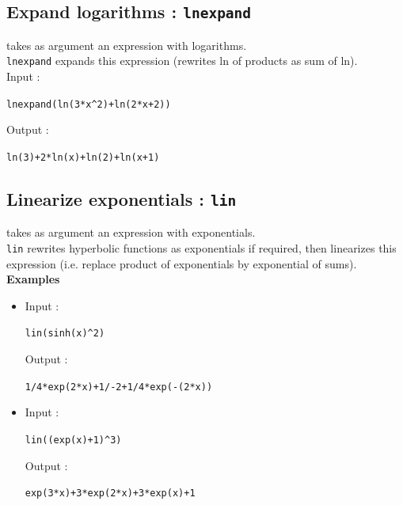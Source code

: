\documentclass[a4paper,11pt]{book}
\begin{document}
\subsection{Expand logarithms : {\tt lnexpand}}
 takes as argument an expression with logarithms.\\
{\tt lnexpand} expands this expression (rewrites ln of products
as sum of ln).\\
Input :
\begin{center}{\tt lnexpand(ln(3*x\verb|^|2)+ln(2*x+2))}\end{center}
Output :
\begin{center}{\tt  ln(3)+2*ln(x)+ln(2)+ln(x+1)}\end{center}

\subsection{Linearize exponentials : {\tt lin}}
 takes as argument an expression with
exponentials.\\
{\tt lin} rewrites hyperbolic functions as exponentials if required,
then linearizes this expression (i.e. replace product of
exponentials by exponential of sums).\\
{\bf Examples}
\begin{itemize}
\item Input :
\begin{center}{\tt lin(sinh(x)\verb|^|2)}\end{center}
Output :
\begin{center}{\tt 1/4*exp(2*x)+1/-2+1/4*exp(-(2*x))}\end{center}

\item Input :
\begin{center}{\tt lin((exp(x)+1)\verb|^|3)}\end{center}
Output :
\begin{center}{\tt exp(3*x)+3*exp(2*x)+3*exp(x)+1}\end{center}
\end{itemize}
\end{document}
